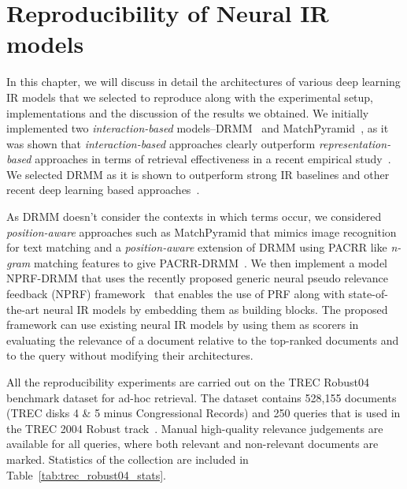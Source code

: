 \chapter{Reproducibility of Neural IR models} %

\label{Chapter4} %

In this chapter, we will discuss in detail the architectures of various deep learning IR models that we selected to reproduce along with the experimental setup, implementations and the discussion of the results we obtained. We initially implemented two \textit{interaction-based} models--DRMM~\citep{Guo2016} and MatchPyramid~\citep{matchpyramid16}, as it was shown that \textit{interaction-based} approaches clearly outperform \textit{representation-based} approaches in terms of retrieval effectiveness in a recent empirical study~\citep{Nie_ictir18}. We selected DRMM as it is shown to outperform strong IR baselines and other recent deep learning based approaches~\citep{Onal_NIR2018}. 

As DRMM doesn't consider the contexts in which terms occur, we considered \textit{position-aware} approaches such as MatchPyramid that mimics image recognition for text matching and a \textit{position-aware} extension of DRMM using PACRR like \textit{n-gram} matching features to give PACRR-DRMM~\citep{pacrr_drmm_18}. We then implement a model NPRF-DRMM that uses the recently proposed generic neural pseudo relevance feedback (NPRF) framework~\citep{li2018nprf} that enables the use of PRF along with state-of-the-art neural IR models by embedding them as building blocks. The proposed framework can use existing neural IR models by using them as scorers in evaluating the relevance of a document relative to the top-ranked documents and to the query without modifying their architectures. 

All the reproducibility experiments are carried out on the TREC Robust04 benchmark dataset for ad-hoc retrieval. The dataset contains 528,155 documents (TREC disks 4 \& 5 minus Congressional Records) and 250 queries that is used in the TREC 2004 Robust track~\citep{robust04}. Manual high-quality relevance judgements are available for all queries, where both relevant and non-relevant documents are marked. Statistics of the collection are included in Table~\ref{tab:trec_robust04_stats}.

